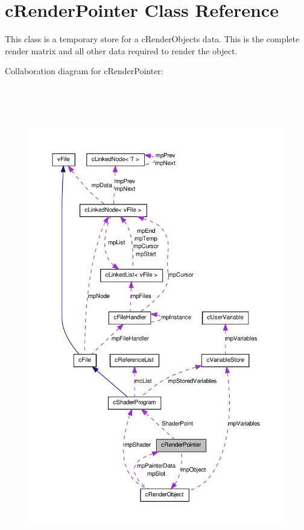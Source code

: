 \hypertarget{classc_render_pointer}{
\section{cRenderPointer Class Reference}
\label{classc_render_pointer}
}


This class is a temporary store for a cRenderObjects data. This is the complete render matrix and all other data required to render the object.  




Collaboration diagram for cRenderPointer:\nopagebreak
\begin{figure}[H]
\begin{center}
\leavevmode
\includegraphics[height=600pt]{classc_render_pointer__coll__graph}
\end{center}
\end{figure}
